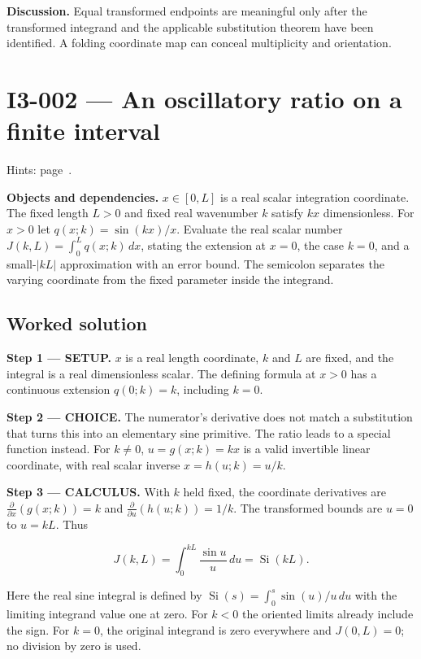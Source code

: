 \documentclass[11pt,oneside,openany]{book}
\begin{document}
\textbf{Discussion.} Equal transformed endpoints are meaningful only after the transformed integrand and the applicable substitution theorem have been identified. A folding coordinate map can conceal multiplicity and orientation.
\clearpage
\section{I3-002 --- An oscillatory ratio on a finite interval}
\label{problem:I3-002}
{\small Hints: page~\pageref{hints:I3-002}.}\par\medskip

\textbf{Objects and dependencies.} \(x\in[0,L]\) is a real scalar integration coordinate. The fixed length \(L>0\) and fixed real wavenumber \(k\) satisfy \(kx\) dimensionless. For \(x>0\) let \(q(x;k)=\sin(kx)/x\). Evaluate the real scalar number \(J(k,L)=\int_0^Lq(x;k)\,dx\), stating the extension at \(x=0\), the case \(k=0\), and a small-\(|kL|\) approximation with an error bound. The semicolon separates the varying coordinate from the fixed parameter inside the integrand.
\subsection*{Worked solution}

\textbf{Step 1 --- SETUP.} \(x\) is a real length coordinate, \(k\) and \(L\) are fixed, and the integral is a real dimensionless scalar. The defining formula at \(x>0\) has a continuous extension \(q(0;k)=k\), including \(k=0\).

\begin{ChoiceStep}
\textbf{Step 2 --- CHOICE.} The numerator's derivative does not match a substitution that turns this into an elementary sine primitive. The ratio leads to a special function instead. For \(k\ne0\), \(u=g(x;k)=kx\) is a valid invertible linear coordinate, with real scalar inverse \(x=h(u;k)=u/k\).

\end{ChoiceStep}
\textbf{Step 3 --- CALCULUS.} With \(k\) held fixed, the coordinate derivatives are \(\frac{\partial}{\partial x}\left(g(x;k)\right)=k\) and \(\frac{\partial}{\partial u}\left(h(u;k)\right)=1/k\). The transformed bounds are \(u=0\) to \(u=kL\). Thus

\[
J(k,L)=\int_0^{kL}\frac{\sin u}{u}\,du=\operatorname{Si}(kL).
\]

Here the real sine integral is defined by \(\operatorname{Si}(s)=\int_0^s\sin(u)/u\,du\) with the limiting integrand value one at zero. For \(k<0\) the oriented limits already include the sign. For \(k=0\), the original integrand is zero everywhere and \(J(0,L)=0\); no division by zero is used.
\end{document}
